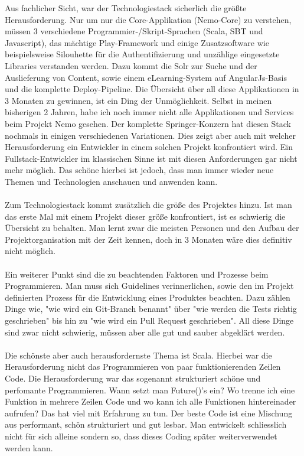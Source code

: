 Aus fachlicher Sicht, war der Technologiestack sicherlich die größte Herausforderung. Nur um nur die Core-Applikation (Nemo-Core) zu verstehen, müssen 3 verschiedene Programmier-/Skript-Sprachen (Scala, SBT und Javascript), das mächtige Play-Framework und einige Zusatzsoftware wie beispielsweise Silouhette für die Authentifizierung und unzählige eingesetzte Libraries verstanden werden. Dazu kommt die Solr zur Suche und der Auslieferung von Content, sowie einem eLearning-System auf AngularJs-Basis und die komplette Deploy-Pipeline. Die Übersicht über all diese Applikationen in 3 Monaten zu gewinnen, ist ein Ding der Unmöglichkeit. Selbst in meinen bisherigen 2 Jahren, habe ich noch immer nicht alle Applikationen und Services beim Projekt Nemo gesehen. Der komplette Springer-Konzern hat diesen Stack nochmals in einigen verschiedenen Variationen. Dies zeigt aber auch mit welcher Herausforderung ein Entwickler in einem solchen Projekt konfrontiert wird. Ein Fullstack-Entwickler im klassischen Sinne ist mit diesen Anforderungen gar nicht mehr möglich. Das schöne hierbei ist jedoch, dass man immer wieder neue Themen und Technologien anschauen und anwenden kann.
\\
\\
Zum Technologiestack kommt zusätzlich die größe des Projektes hinzu. Ist man das erste Mal mit einem Projekt dieser größe konfrontiert, ist es schwierig die Übersicht zu behalten. Man lernt zwar die meisten Personen und den Aufbau der Projektorganisation mit der Zeit kennen, doch in 3 Monaten wäre dies definitiv nicht möglich. 
\\
\\
Ein weiterer Punkt sind die zu beachtenden Faktoren und Prozesse beim Programmieren. Man muss sich Guidelines verinnerlichen, sowie den im Projekt definierten Prozess für die Entwicklung eines Produktes beachten. Dazu zählen Dinge wie, "wie wird ein Git-Branch benannt" über "wie werden die Tests richtig geschrieben" bis hin zu "wie wird ein Pull Request geschrieben". All diese Dinge sind zwar nicht schwierig, müssen aber alle gut und sauber abgeklärt werden. 
\\
\\
Die schönste aber auch herausfordernste Thema ist Scala. Hierbei war die Herausforderung nicht das Programmieren von paar funktionierenden Zeilen Code. Die Herausforderung war das sogenannt strukturiert schöne und perfomante Programmieren. Wann setzt man Future()'s ein? Wo   trenne ich eine Funktion in mehrere Zeilen Code und wo kann ich alle Funktionen hintereinader aufrufen? Das hat viel mit Erfahrung zu tun. Der beste Code ist eine Mischung aus performant, schön strukturiert und gut lesbar. Man entwickelt schliesslich nicht für sich alleine sondern so, dass dieses Coding später weiterverwendet werden kann. 

